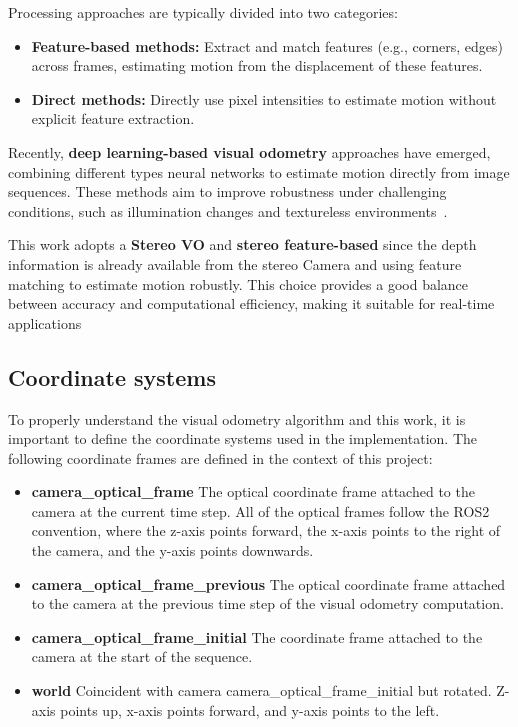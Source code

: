 Processing approaches are typically divided into two categories:

\begin{itemize}
  \item \textbf{Feature-based methods:} Extract and match features (e.g., corners, edges) across frames,
  estimating motion from the displacement of these features.

  \item \textbf{Direct methods:} Directly use pixel intensities to estimate motion without explicit
  feature extraction.
\end{itemize}

Recently, \textbf{deep learning-based visual odometry} approaches have emerged, combining
different types neural networks to estimate motion directly from image sequences.
These methods aim to improve robustness under challenging conditions, such as illumination
changes and textureless environments~\cite{visual_odometry_review}.

This work adopts a \textbf{Stereo \gls{VO}} and \textbf{stereo feature-based} since the depth information is already available
from the stereo Camera and using feature matching to estimate motion robustly. This choice provides a good
balance between accuracy and computational efficiency, making it suitable for real-time applications

\subsection{Coordinate systems}\label{sec:ReferenceFramesCoordinateSystems and ROS2 transforms}

To properly understand the visual odometry algorithm and this work, it is important to define the
coordinate systems used in the implementation. The following coordinate frames are
defined in the context of this project:

\begin{itemize}
\item \textbf{camera\_optical\_frame} The optical coordinate frame attached to the camera at the current time step. All of the optical frames follow
the ROS2 convention, where the z-axis points forward, the x-axis points to the right of the camera, and the y-axis points downwards.

\item \textbf{camera\_optical\_frame\_previous} The optical coordinate frame attached to the camera at the previous time step of
the visual odometry computation.

\item \textbf{camera\_optical\_frame\_initial} The coordinate frame attached to the camera at the start of the sequence.
\item \textbf{world} Coincident with camera camera\_optical\_frame\_initial but rotated. Z-axis points up, x-axis points forward, and y-axis points to the left.
\end{itemize}


